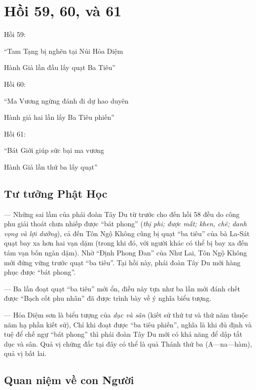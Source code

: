 \chapter{Hồi 59, 60, và 61} %
\label{cha:hoi_59_60}

Hồi 59:

\begin{itshape}
``Tam Tạng bị nghẽn tại Núi Hỏa Diệm

Hành Giả lần đầu lấy quạt Ba Tiêu''
\end{itshape}

Hồi 60:

\begin{itshape}
``Ma Vương ngừng đánh đi dự hao duyên

Hành giả hai lần lấy Ba Tiêu phiến''
\end{itshape}

Hồi 61:

\begin{itshape}
``Bát Giới giúp sức bại ma vương

Hành Giả lần thứ ba lấy quạt''
\end{itshape}

\section{Tư tưởng Phật Học} %
\label{sec:59_60_phat_hoc}

— Những sai lầm của phái đoàn Tây Du từ trước cho đến hồi 58 đều do công phu giải thoát chưa nhiếp được ``bát phong'' (\emph{thị phi; được mất; khen, chê; danh vọng và lợi dưỡng}), cả đến Tôn Ngộ Không cũng bị quạt ``ba tiêu'' của bà La-Sát quạt bay xa hơn hai vạn dặm (trong khi đó, với người khác có thể bị bay xa đến tám vạn bốn ngàn dặm). Nhờ ``Định Phong Đan'' của Như Lai, Tôn Ngộ Không mới đứng vững trước quạt ``ba tiêu''. Tại hồi này, phái đoàn Tây Du mới hàng phục được ``bát phong''.

— Ba lần đoạt quạt ``ba tiêu'' mới ổn, điều này tựa như ba lần mới đánh chết được ``Bạch cốt phu nhân'' đã được trình bày về ý nghĩa biểu tượng.

— Hỏa Diệm sơn là biểu tượng của \emph{dục và sân} (kiết sử thứ tư và thứ năm thuộc năm hạ phần kiết sử), Chỉ khi đoạt được ``ba tiêu phiến'', nghĩa là khi đủ định và tuệ để chế ngự ``bát phong'' thì phái đoàn Tây Du mới có khả năng để dập tắt dục và sân. Quả vị chứng đắc tại đây có thể là quả Thánh thứ ba (A—na—hàm), quả vị bất lai.

\section{Quan niệm về con Người} %
\label{sec:59_60_con_nguoi}

